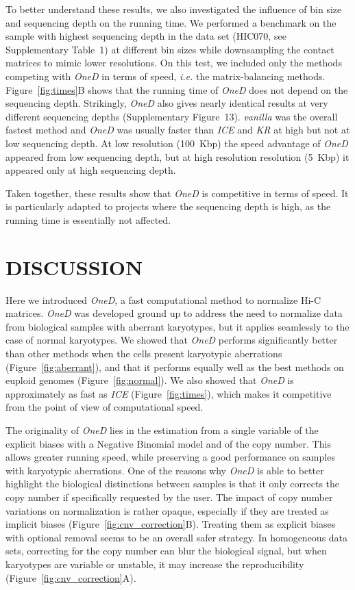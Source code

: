 \documentclass[a4,center,fleqn]{NAR}
\begin{document}
To better understand these results, we also investigated the influence of
bin size and sequencing depth on the running time. We performed a
benchmark on the sample with highest sequencing depth in the data set
(HIC070, see Supplementary Table~1) at different bin sizes while
downsampling the contact matrices to mimic lower resolutions. On this
test, we included only the methods competing with \textit{OneD} in terms
of speed, \textit{i.e.} the matrix-balancing methods.
Figure~\ref{fig:times}B shows that the running time of \textit{OneD} does
not depend on the sequencing depth. Strikingly, \textit{OneD} also gives
nearly identical results at very different sequencing depths
(Supplementary Figure~13). \textit{vanilla} was the overall fastest method
and \textit{OneD} was usually faster than \textit{ICE} and \textit{KR}
at high but not at low sequencing depth. At low resolution (100~Kbp) the
speed advantage of \textit{OneD} appeared from low sequencing depth, but
at high resolution resolution (5~Kbp) it appeared only at high sequencing
depth.

Taken together, these results show that \textit{OneD} is competitive in
terms of speed. It is particularly adapted to projects where the
sequencing depth is high, as the running time is essentially not affected.



\section{DISCUSSION}

Here we introduced \textit{OneD}, a fast computational method to normalize
Hi-C matrices. \textit{OneD} was developed ground up to address the need
to normalize data from biological samples with aberrant karyotypes, but it
applies seamlessly to the case of normal karyotypes. We showed that
\textit{OneD} performs significantly better than other methods when the
cells present karyotypic aberrations (Figure~\ref{fig:aberrant}), and that
it performs equally well as the best methods on euploid genomes
(Figure~\ref{fig:normal}). We also showed that \textit{OneD} is
approximately as fast as \textit{ICE} (Figure~\ref{fig:times}), which
makes it competitive from the point of view of computational speed.

The originality of \textit{OneD} lies in the estimation from a single
variable of the explicit biases with a Negative Binomial model and of the
copy number. This allows greater running speed, while preserving a good
performance on samples with karyotypic aberrations. One of the reasons why
\textit{OneD} is able to better highlight the biological distinctions
between samples is that it only corrects the copy number if specifically
requested by the user. The impact of copy number variations on
normalization is rather opaque, especially if they are treated as implicit
biases (Figure~\ref{fig:cnv_correction}B). Treating them as explicit
biases with optional removal seems to be an overall safer strategy. In
homogeneous data sets, correcting for the copy number can blur the
biological signal, but when karyotypes are variable or unstable, it may
increase the reproducibility (Figure~\ref{fig:cnv_correction}A).
\end{document}
